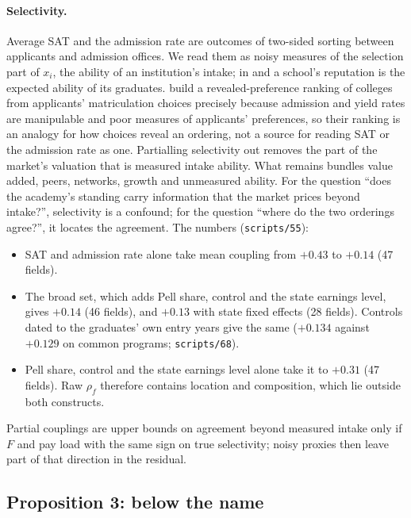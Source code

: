 \documentclass[11pt]{article}
\begin{document}
\paragraph{Selectivity.} Average SAT and the admission rate are outcomes of two-sided sorting between applicants
and admission offices. We read them as noisy measures of the selection part of $x_i$, the ability of an
institution's intake; in \citet{macleod2015reputation} and \citet{macleod2017big} a school's reputation is the
expected ability of its graduates. \citet{avery2013revealed} build a revealed-preference ranking of colleges from
applicants' matriculation choices precisely because admission and yield rates are manipulable and poor measures of
applicants' preferences, so their ranking is an analogy for how choices reveal an ordering, not a source for
reading SAT or the admission rate as one. Partialling selectivity out removes the part of the market's valuation
that is measured intake ability. What remains bundles value added, peers, networks, growth and unmeasured
ability. For the question ``does the academy's standing carry information that the market prices beyond
intake?'', selectivity is a confound; for the question ``where do the two orderings agree?'', it locates the
agreement. The numbers (\texttt{scripts/55}):
\begin{itemize}
\item SAT and admission rate alone take mean coupling from $+0.43$ to $+0.14$ (47 fields).
\item The broad set, which adds Pell share, control and the state earnings level, gives $+0.14$ (46 fields), and
$+0.13$ with state fixed effects (28 fields). Controls dated to the graduates' own entry years give the same
($+0.134$ against $+0.129$ on common programs; \texttt{scripts/68}).
\item Pell share, control and the state earnings level alone take it to $+0.31$ (47 fields). Raw $\rho_f$
therefore contains location and composition, which lie outside both constructs.
\end{itemize}
Partial couplings are upper bounds on agreement beyond measured intake only if $F$ and pay load with the same
sign on true selectivity; noisy proxies then leave part of that direction in the residual.

\subsection{Proposition 3: below the name}\label{si:theory:umbrella}
\end{document}
